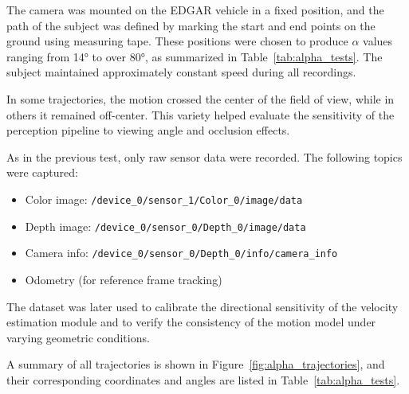 The camera was mounted on the EDGAR vehicle in a fixed position, and the 
path of the subject was defined by marking the start and end points on the ground 
using measuring tape. These positions were chosen to produce \(\alpha\) values 
ranging from 14° to over 80°, as summarized in Table~\ref{tab:alpha_tests}. The 
subject maintained approximately constant speed during all recordings.

In some trajectories, the motion crossed the center of the field of view, while 
in others it remained off-center. This variety helped evaluate the sensitivity 
of the perception pipeline to viewing angle and occlusion effects.

As in the previous test, only raw sensor data were recorded. The following topics 
were captured:

\begin{itemize}
  \item Color image: 
    \texttt{/device\_0/sensor\_1/Color\_0/image/data}
  \item Depth image: 
    \texttt{/device\_0/sensor\_0/Depth\_0/image/data}
  \item Camera info: 
    \texttt{/device\_0/sensor\_0/Depth\_0/info/camera\_info}
  \item Odometry (for reference frame tracking)
\end{itemize}

The dataset was later used to calibrate the directional sensitivity of the 
velocity estimation module and to verify the consistency of the motion model 
under varying geometric conditions.

A summary of all trajectories is shown in Figure~\ref{fig:alpha_trajectories}, 
and their corresponding coordinates and angles are listed in 
Table~\ref{tab:alpha_tests}.

